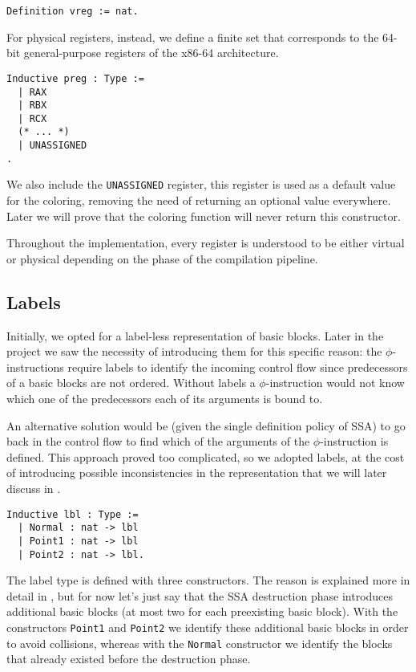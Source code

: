 \begin{lstlisting}[style=Coq]
Definition vreg := nat.
\end{lstlisting}

For physical registers, instead, we define a finite set that corresponds to the 64-bit general-purpose registers of the x86-64 architecture.

\begin{lstlisting}[style=Coq]
Inductive preg : Type :=
  | RAX
  | RBX
  | RCX
  (* ... *)
  | UNASSIGNED
.
\end{lstlisting}

We also include the \texttt{UNASSIGNED} register, this register is used as a default value for the coloring, removing the need of returning an optional value everywhere. Later we will prove that the coloring function will never return this constructor.

Throughout the implementation, every register is understood to be either virtual or physical depending on the phase of the compilation pipeline.

\subsection{Labels}

Initially, we opted for a label-less representation of basic blocks.
Later in the project we saw the necessity of introducing them for this specific reason: the $\phi$-instructions require labels to identify the incoming control flow since predecessors of a basic blocks are not ordered. Without labels a $\phi$-instruction would not know which one of the predecessors each of its arguments is bound to.

An alternative solution would be (given the single definition policy of SSA) to go back in the control flow to find which of the arguments of the $\phi$-instruction is defined. This approach proved too complicated, so we adopted labels, at the cost of introducing possible inconsistencies in the representation that we will later discuss in .

\begin{lstlisting}[style=Coq]
Inductive lbl : Type :=
  | Normal : nat -> lbl
  | Point1 : nat -> lbl
  | Point2 : nat -> lbl.
\end{lstlisting}

The label type is defined with three constructors. The reason is explained more in detail in , but for now let's just say that the SSA destruction phase introduces additional basic blocks (at most two for each preexisting basic block). With the constructors \texttt{Point1} and \texttt{Point2} we identify these additional basic blocks in order to avoid collisions, whereas with the \texttt{Normal} constructor we identify the blocks that already existed before the destruction phase.

